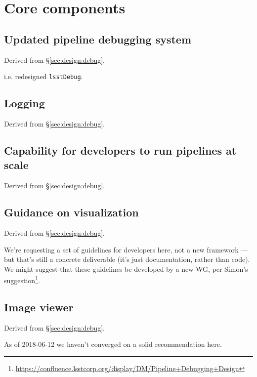 \section{Core components}

\subsection{Updated pipeline debugging system}


Derived from \S\ref{sec:design:debug}.

i.e. redesigned \texttt{lsstDebug}.

\subsection{Logging}


Derived from \S\ref{sec:design:debug}.

\subsection{Capability for developers to run pipelines at scale}


Derived from \S\ref{sec:design:debug}.

\subsection{Guidance on visualization}


Derived from \S\ref{sec:design:debug}.

We're requesting a set of guidelines for developers here, not a new framework
--- but that's still a concrete deliverable (it's just documentation, rather
than code). We might suggest that these guidelines be developed by a new WG,
per Simon's
suggestion\footnote{\url{https://confluence.lsstcorp.org/display/DM/Pipeline+Debugging+Design}}.

\subsection{Image viewer}


Derived from \S\ref{sec:design:debug}.

As of 2018-06-12 we haven't converged on a solid recommendation here.

